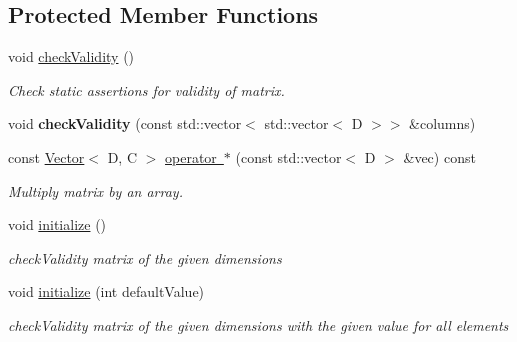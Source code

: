 \subsection*{Protected Member Functions}
\begin{DoxyCompactItemize}
\item 
\mbox{\label{classrev_1_1_matrix_abfa9a150eb63accefec555d55dd0d4d1}} 
void \mbox{\hyperlink{classrev_1_1_matrix_abfa9a150eb63accefec555d55dd0d4d1}{check\+Validity}} ()
\begin{DoxyCompactList}\small\item\em Check static assertions for validity of matrix. \end{DoxyCompactList}\item 
\mbox{\label{classrev_1_1_matrix_a8b260b42103e9076599e9e5f8205cada}} 
void {\bfseries check\+Validity} (const std\+::vector$<$ std\+::vector$<$ D $>$$>$ \&columns)
\item 
const \mbox{\hyperlink{classrev_1_1_vector}{Vector}}$<$ D, C $>$ \mbox{\hyperlink{classrev_1_1_matrix_a1b1a8827bda6414891c3cf29500119da}{operator $\ast$}} (const std\+::vector$<$ D $>$ \&vec) const
\begin{DoxyCompactList}\small\item\em Multiply matrix by an array. \end{DoxyCompactList}\item 
\mbox{\label{classrev_1_1_matrix_a1b7dcd6bf8c33784abaa0d6762b51879}} 
void \mbox{\hyperlink{classrev_1_1_matrix_a1b7dcd6bf8c33784abaa0d6762b51879}{initialize}} ()
\begin{DoxyCompactList}\small\item\em check\+Validity matrix of the given dimensions \end{DoxyCompactList}\item 
\mbox{\label{classrev_1_1_matrix_a7ab4a6480c014639d29fe088bb3bf795}} 
void \mbox{\hyperlink{classrev_1_1_matrix_a7ab4a6480c014639d29fe088bb3bf795}{initialize}} (int default\+Value)
\begin{DoxyCompactList}\small\item\em check\+Validity matrix of the given dimensions with the given value for all elements \end{DoxyCompactList}\end{DoxyCompactItemize}
